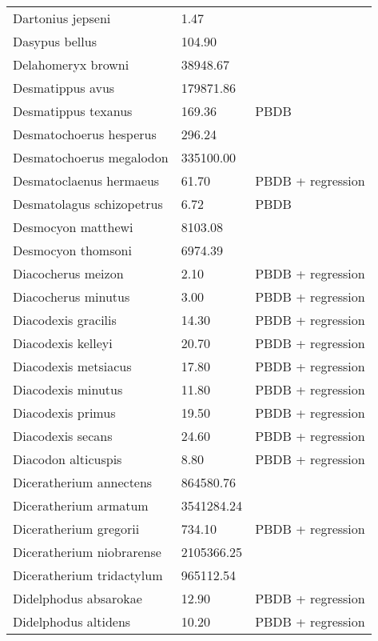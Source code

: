 \documentclass{article}
\begin{document}
\begin{center}
\begin{longtable}{p{} p{} p{}}
    Dartonius jepseni & 1.47 & \cite{Hay1969} \\ 
    Dasypus bellus & 104.90 & \cite{Smith2004} \\ 
    Delahomeryx browni & 38948.67 & \cite{Tomiya2013} \\ 
    Desmatippus avus & 179871.86 & \cite{Tomiya2013} \\ 
    Desmatippus texanus & 169.36 & PBDB \\ 
    Desmatochoerus hesperus & 296.24 & \cite{McGrew1939} \\ 
    Desmatochoerus megalodon & 335100.00 & \cite{McKenna2011} \\ 
    Desmatoclaenus hermaeus & 61.70 & PBDB + regression \\ 
    Desmatolagus schizopetrus & 6.72 & PBDB \\ 
    Desmocyon matthewi & 8103.08 & \cite{Tomiya2013} \\ 
    Desmocyon thomsoni & 6974.39 & \cite{Tomiya2013} \\ 
    Diacocherus meizon & 2.10 & PBDB + regression \\ 
    Diacocherus minutus & 3.00 & PBDB + regression \\ 
    Diacodexis gracilis & 14.30 & PBDB + regression \\ 
    Diacodexis kelleyi & 20.70 & PBDB + regression \\ 
    Diacodexis metsiacus & 17.80 & PBDB + regression \\ 
    Diacodexis minutus & 11.80 & PBDB + regression \\ 
    Diacodexis primus & 19.50 & PBDB + regression \\ 
    Diacodexis secans & 24.60 & PBDB + regression \\ 
    Diacodon alticuspis & 8.80 & PBDB + regression \\ 
    Diceratherium annectens & 864580.76 & \cite{Tomiya2013} \\ 
    Diceratherium armatum & 3541284.24 & \cite{Tomiya2013} \\ 
    Diceratherium gregorii & 734.10 & PBDB + regression \\ 
    Diceratherium niobrarense & 2105366.25 & \cite{Tomiya2013} \\ 
    Diceratherium tridactylum & 965112.54 & \cite{Tomiya2013} \\ 
    Didelphodus absarokae & 12.90 & PBDB + regression \\ 
    Didelphodus altidens & 10.20 & PBDB + regression \\ 

\end{longtable}
\end{center}
\end{document}
